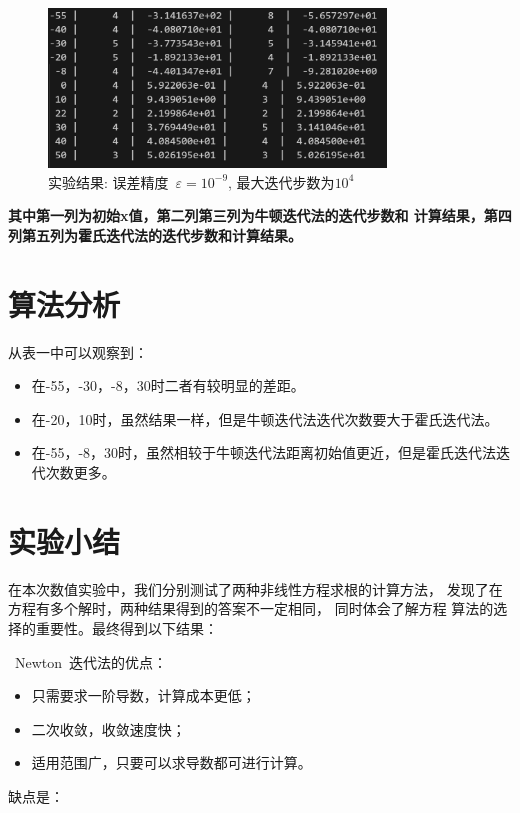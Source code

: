 \documentclass[10pt,a4paper,oneside]{article}
\begin{document}
\begin{figure}[H]
  \centering
  \caption{实验结果: 误差精度~$\varepsilon = 10^{-9}$, 最大迭代步数为$10^4$}
  \includegraphics[width=0.8\textwidth]{jg.png}
\end{figure}


{\bf 其中第一列为初始x值，第二列第三列为牛顿迭代法的迭代步数和
计算结果，第四列第五列为霍氏迭代法的迭代步数和计算结果。}

\section{算法分析}
从表一中可以观察到：
\begin{itemize}
    \item 在-55，-30，-8，30时二者有较明显的差距。
    \item 在-20，10时，虽然结果一样，但是牛顿迭代法迭代次数要大于霍氏迭代法。
    \item 在-55，-8，30时，虽然相较于牛顿迭代法距离初始值更近，但是霍氏迭代法迭代次数更多。
\end{itemize}



\section{实验小结}
在本次数值实验中，我们分别测试了两种非线性方程求根的计算方法，
发现了在方程有多个解时，两种结果得到的答案不一定相同，
同时体会了解方程
算法的选择的重要性。最终得到以下结果：

~Newton~迭代法的优点：

\begin{itemize}
    \item 只需要求一阶导数，计算成本更低；
    \item 二次收敛，收敛速度快；
    \item 适用范围广，只要可以求导数都可进行计算。
\end{itemize}

缺点是：
\end{document}
